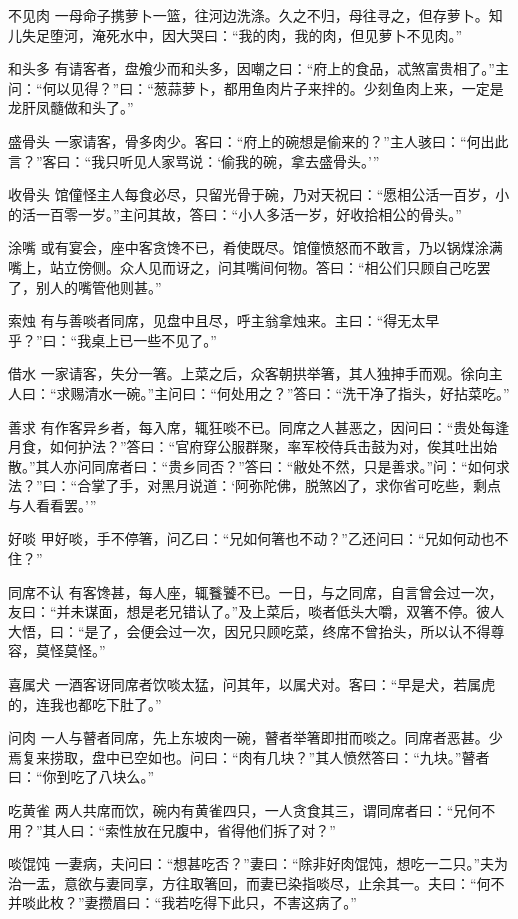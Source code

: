 \documentclass[12pt,UTF8]{ctexbook}
\begin{document}
不见肉
一母命子携萝卜一篮，往河边洗涤。久之不归，母往寻之，但存萝卜。知儿失足堕河，淹死水中，因大哭曰：“我的肉，我的肉，但见萝卜不见肉。”

和头多
有请客者，盘飧少而和头多，因嘲之曰：“府上的食品，忒煞富贵相了。”主问：“何以见得？”曰：“葱蒜萝卜，都用鱼肉片子来拌的。少刻鱼肉上来，一定是龙肝凤髓做和头了。”

盛骨头
一家请客，骨多肉少。客曰：“府上的碗想是偷来的？”主人骇曰：“何出此言？”客曰：“我只听见人家骂说：‘偷我的碗，拿去盛骨头。’”

收骨头
馆僮怪主人每食必尽，只留光骨于碗，乃对天祝曰：“愿相公活一百岁，小的活一百零一岁。”主问其故，答曰：“小人多活一岁，好收拾相公的骨头。”

涂嘴
或有宴会，座中客贪馋不已，肴使既尽。馆僮愤怒而不敢言，乃以锅煤涂满嘴上，站立傍侧。众人见而讶之，问其嘴间何物。答曰：“相公们只顾自己吃罢了，别人的嘴管他则甚。”

索烛
有与善啖者同席，见盘中且尽，呼主翁拿烛来。主曰：“得无太早乎？”曰：“我桌上已一些不见了。”

借水
一家请客，失分一箸。上菜之后，众客朝拱举箸，其人独抻手而观。徐向主人曰：“求赐清水一碗。”主问曰：“何处用之？”答曰：“洗干净了指头，好拈菜吃。”

善求
有作客异乡者，每入席，辄狂啖不已。同席之人甚恶之，因问曰：“贵处每逢月食，如何护法？”答曰：“官府穿公服群聚，率军校侍兵击鼓为对，俟其吐出始散。”其人亦问同席者曰：“贵乡同否？”答曰：“敝处不然，只是善求。”问：“如何求法？”曰：“合掌了手，对黑月说道：‘阿弥陀佛，脱煞凶了，求你省可吃些，剩点与人看看罢。’”

好啖
甲好啖，手不停箸，问乙曰：“兄如何箸也不动？”乙还问曰：“兄如何动也不住？”

同席不认
有客馋甚，每人座，辄餮饕不已。一日，与之同席，自言曾会过一次，友曰：“并未谋面，想是老兄错认了。”及上菜后，啖者低头大嚼，双箸不停。彼人大悟，曰：“是了，会便会过一次，因兄只顾吃菜，终席不曾抬头，所以认不得尊容，莫怪莫怪。”

喜属犬
一酒客讶同席者饮啖太猛，问其年，以属犬对。客曰：“早是犬，若属虎的，连我也都吃下肚了。”

问肉
一人与瞽者同席，先上东坡肉一碗，瞽者举箸即拑而啖之。同席者恶甚。少焉复来捞取，盘中已空如也。问曰：“肉有几块？”其人愤然答曰：“九块。”瞽者曰：“你到吃了八块么。”

吃黄雀
两人共席而饮，碗内有黄雀四只，一人贪食其三，谓同席者曰：“兄何不用？”其人曰：“索性放在兄腹中，省得他们拆了对？”

啖馄饨
一妻病，夫问曰：“想甚吃否？”妻曰：“除非好肉馄饨，想吃一二只。”夫为治一盂，意欲与妻同享，方往取箸回，而妻已染指啖尽，止余其一。夫曰：“何不并啖此枚？”妻攒眉曰：“我若吃得下此只，不害这病了。”
\end{document}
